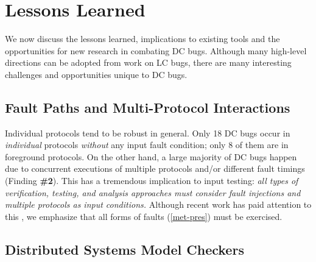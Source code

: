 \vten

\section{Lessons Learned}
\label{sec-less}

We now discuss the lessons learned, implications to existing tools
and the opportunities for new research in combating DC bugs.  
Although many high-level
directions can be adopted from work on LC bugs, there are many
interesting challenges and opportunities unique to DC bugs.

\subsection{Fault Paths and Multi-Protocol Interactions}
\label{less-fault}


Individual protocols tend to be robust in general.  Only 18 DC bugs
occur in {\em individual} protocols {\em without} any input 
fault condition; only
8 of them are in foreground protocols.  On the other hand, a large
majority of DC bugs happen due to concurrent executions of multiple
protocols and/or different fault timings (Finding {\bf \#2}).
%
This has a tremendous implication to input testing: {\em all types of
  verification, testing, and analysis approaches must consider fault
  injections and multiple protocols as input conditions.}
%
Although recent work has paid attention to this
\cite{Gunawi+11-FateDestini, Joshi+11-PreFail, 
Yuan+14-SimpleTesting}, we emphasize
that all forms of faults (\sec\ref{met-pres}) must be exercised.


\subsection{Distributed Systems Model Checkers}
\label{less-dmck}

